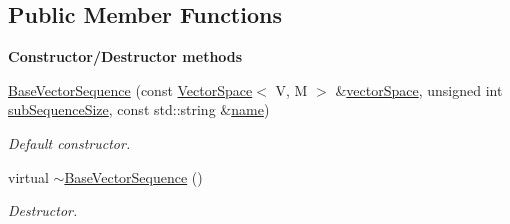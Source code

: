 \subsection*{Public Member Functions}
\begin{Indent}{\bf Constructor/\-Destructor methods}\par
\begin{DoxyCompactItemize}
\item 
\hyperlink{class_q_u_e_s_o_1_1_base_vector_sequence_a42a447ef253acf28ccb9a20706665b54}{Base\-Vector\-Sequence} (const \hyperlink{class_q_u_e_s_o_1_1_vector_space}{Vector\-Space}$<$ V, M $>$ \&\hyperlink{class_q_u_e_s_o_1_1_base_vector_sequence_af9a4dd979a2fa8dee85bb07793b59ba2}{vector\-Space}, unsigned int \hyperlink{class_q_u_e_s_o_1_1_base_vector_sequence_afd6278702d40bdf1044697bbd6ad1957}{sub\-Sequence\-Size}, const std\-::string \&\hyperlink{class_q_u_e_s_o_1_1_base_vector_sequence_a48f6fe02cf77f4233d3bcdfef3870f19}{name})
\begin{DoxyCompactList}\small\item\em Default constructor. \end{DoxyCompactList}\item 
virtual \hyperlink{class_q_u_e_s_o_1_1_base_vector_sequence_a2e86f2e6dc72338301fcc6898e6f87d4}{$\sim$\-Base\-Vector\-Sequence} ()
\begin{DoxyCompactList}\small\item\em Destructor. \end{DoxyCompactList}\end{DoxyCompactItemize}
\end{Indent}
